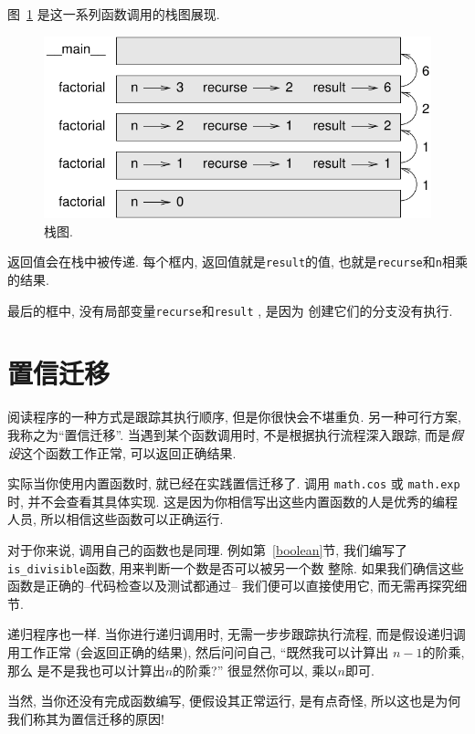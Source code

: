 \documentclass[10pt]{book}
\begin{document}
图~\ref{fig.stack3} 是这一系列函数调用的栈图展现.

\begin{figure}
\centerline
{\includegraphics[scale=0.8]{figs/stack3.pdf}}
\caption{栈图.}
\label{fig.stack3}
\end{figure}

返回值会在栈中被传递. 
每个框内, 返回值就是{\tt result}的值, 也就是{\tt recurse}和{\tt n}相乘的结果. 

最后的框中, 没有局部变量{\tt recurse}和{\tt result} , 是因为
创建它们的分支没有执行. 

\section{置信迁移}

阅读程序的一种方式是跟踪其执行顺序, 但是你很快会不堪重负. 
另一种可行方案, 我称之为``置信迁移''. 当遇到某个函数调用时, 
不是根据执行流程深入跟踪, 
而是{\em 假设}这个函数工作正常, 可以返回正确结果. 

实际当你使用内置函数时, 就已经在实践置信迁移了. 调用
{\tt math.cos} 或 {\tt math.exp}时, 并不会查看其具体实现. 
这是因为你相信写出这些内置函数的人是优秀的编程人员, 
所以相信这些函数可以正确运行. 

对于你来说, 调用自己的函数也是同理. 例如第~\ref{boolean}节, 
我们编写了\verb"is_divisible"函数, 用来判断一个数是否可以被另一个数
整除. 如果我们确信这些函数是正确的--代码检查以及测试都通过--
我们便可以直接使用它, 而无需再探究细节. 

递归程序也一样. 当你进行递归调用时, 
无需一步步跟踪执行流程, 而是假设递归调用工作正常
(会返回正确的结果), 然后问问自己, ``既然我可以计算出 $n-1$的阶乘, 那么
是不是我也可以计算出$n$的阶乘?'' 很显然你可以, 乘以$n$即可. 

当然, 当你还没有完成函数编写, 便假设其正常运行, 是有点奇怪, 
所以这也是为何我们称其为置信迁移的原因!
\end{document}
